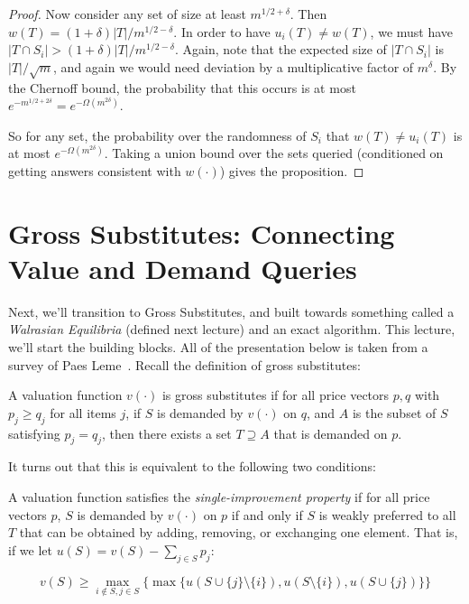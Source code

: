 \begin{proof}
Now consider any set of size at least $m^{1/2+\delta}$. Then $w(T) = (1+\delta)|T|/m^{1/2-\delta}$. In order to have $u_i(T) \neq w(T)$, we must have $|T \cap S_i| > (1+\delta)|T|/m^{1/2-\delta}$. Again, note that the expected size of $|T \cap S_i|$ is $|T|/\sqrt{m}$, and again we would need deviation by a multiplicative factor of $m^{\delta}$.  By the Chernoff bound, the probability that this occurs is at most $e^{-m^{1/2+2\delta}} = e^{-\Omega(m^{2\delta})}$.

So for any set, the probability over the randomness of $S_i$ that $w(T) \neq u_i(T)$ is at most $e^{-\Omega(m^{2\delta})}$. Taking a union bound over the sets queried (conditioned on getting answers consistent with $w(\cdot)$) gives the proposition.
\end{proof}

\section{Gross Substitutes: Connecting Value and Demand Queries}
Next, we'll transition to Gross Substitutes, and built towards something called a \emph{Walrasian Equilibria} (defined next lecture) and an exact algorithm. This lecture, we'll start the building blocks. All of the presentation below is taken from a survey of Paes Leme~\cite{Paesleme16}. Recall the definition of gross substitutes:

\begin{definition} A valuation function $v(\cdot)$ is gross substitutes if for all price vectors $p, q$ with $p_j \geq q_j$ for all items $j$, if $S$ is demanded by $v(\cdot)$ on $q$, and $A$ is the subset of $S$ satisfying $p_j = q_j$, then there exists a set $T \supseteq A$ that is demanded on $p$.
\end{definition}

It turns out that this is equivalent to the following two conditions:
\begin{definition} A valuation function satisfies the \emph{single-improvement property} if for all price vectors $p$, $S$ is demanded by $v(\cdot)$ on $p$ if and only if $S$ is weakly preferred to all $T$ that can be obtained by adding, removing, or exchanging one element. That is, if we let $u(S) = v(S) - \sum_{j \in S} p_j$:

$$v(S) \geq \max_{i \notin S, j \in S} \{ \max\{u(S \cup \{j\} \setminus \{i\}), u(S \setminus \{i\}), u(S \cup \{j\})\}\}$$
\end{definition}

